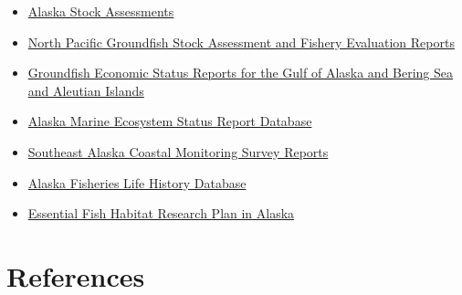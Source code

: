 \documentclass[
  letterpaper,
  oneside,
  open=any]{scrbook}
\providecommand{\tightlist}{%
  \setlength{\itemsep}{0pt}\setlength{\parskip}{0pt}}\usepackage{longtable,booktabs,array}
\begin{document}
\begin{itemize}
\tightlist
\item
  \href{https://www.fisheries.noaa.gov/alaska/population-assessments/alaska-stock-assessments}{Alaska
  Stock Assessments}
\item
  \href{https://www.fisheries.noaa.gov/alaska/population-assessments/north-pacific-groundfish-stock-assessment-and-fishery-evaluation}{North
  Pacific Groundfish Stock Assessment and Fishery Evaluation Reports}
\item
  \href{https://www.fisheries.noaa.gov/alaska/commercial-fishing/groundfish-economic-status-reports-gulf-alaska-and-bering-sea-and-aleutian-islands}{Groundfish
  Economic Status Reports for the Gulf of Alaska and Bering Sea and
  Aleutian Islands}
\item
  \href{https://www.fisheries.noaa.gov/resource/data/alaska-marine-ecosystem-status-report-archive}{Alaska
  Marine Ecosystem Status Report Database}
\item
  \href{https://www.fisheries.noaa.gov/alaska/commercial-fishing/southeast-alaska-coastal-monitoring-survey-reports}{Southeast
  Alaska Coastal Monitoring Survey Reports}
\item
  \href{https://www.fisheries.noaa.gov/resource/data/alaska-fisheries-life-history-database}{Alaska
  Fisheries Life History Database}
\item
  \href{https://www.fisheries.noaa.gov/alaska/habitat-conservation/essential-fish-habitat-research-plan-alaska}{Essential
  Fish Habitat Research Plan in Alaska}
\end{itemize}

\hypertarget{references}{%
\chapter{References}\label{references}}
\end{document}
